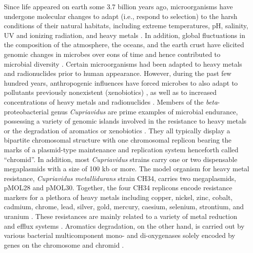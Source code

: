 Since life appeared on earth some 3.7 billion years ago, microorganisms have undergone molecular changes to adapt (i.e., respond to selection) to the harsh conditions of their natural habitats, including extreme temperatures, pH, salinity, UV and ionizing radiation, and heavy metals \citep{bakermans2015microbial}. In addition, global fluctuations in the composition of the atmosphere, the oceans, and the earth crust have elicited genomic changes in microbes over eons of time and hence contributed to microbial diversity \citep{knoll2015paleobiological}. Certain microorganisms had been adapted to heavy metals and radionuclides prior to human appearance. However, during the past few hundred years, anthropogenic influences have forced microbes to also adapt to pollutants previously nonexistent (xenobiotics) \citep{springael2004horizontal, cao2012characterization, ilori2015catabolic, mergeay2014adaptation}, as well as to increased concentrations of heavy metals and radionuclides \citep{nies1999microbial, mergeay2000bacteria, sobecky2009horizontal}.
Members of the \textit{beta}-proteobacterial genus \textit{Cupriavidus} are prime examples of microbial endurance, possessing a variety of genomic islands involved in the resistance to heavy metals or the degradation of aromatics or xenobiotics \citep{pohlmann2006genome, amadou2008genome, janssen2010complete, lykidis2010complete, poehlein2011complete,cserhati2012novo, hong2012whole, li2013genome, ray2015complete, wang2015genome, fang2016complete}. They all typically display a bipartite chromosomal structure with one chromosomal replicon bearing the marks of a plasmid-type maintenance and replication system henceforth called “chromid”. In addition, most \textit{Cupriavidus} strains carry one or two dispensable megaplasmids with a size of 100 kb or more. The model organism for heavy metal resistance, \textit{Cupriavidus metallidurans} strain CH34, carries two megaplasmids, pMOL28 and pMOL30. Together, the four CH34 replicons encode resistance markers for a plethora of heavy metals including copper, nickel, zinc, cobalt, cadmium, chrome, lead, silver, gold, mercury, caesium, selenium, strontium, and uranium \citep{janssen2010complete, mergeay2003ralstonia, monchy2007plasmids, avoscan2007uranium, monsieurs2011heavy, salem2013strontium}. These resistances are mainly related to a variety of metal reduction and efflux systems \citep{van2015genomic, vandenbussche2015metal,nies2016biological}. Aromatics degradation, on the other hand, is carried out by various bacterial multicomponent mono- and di-oxygenases solely encoded by genes on the chromosome and chromid \citep{millacura2017degradation}.
